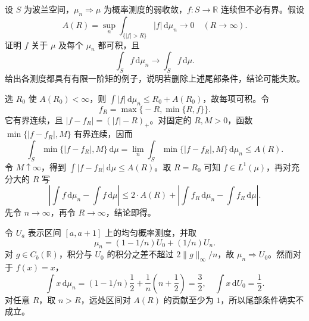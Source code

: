 \begin{exercise}\label{b1:ex:12-unbounded-tests}
设 \(S\) 为波兰空间，\(\mu_n\Rightarrow\mu\) 为概率测度的弱收敛，\(f:S\rightarrow\mathbb R\) 连续但不必有界。假设
\[
 A(R)=\sup_n\int_{\{|f|>R\}}|f|\,\mathrm d\mu_n
 \longrightarrow0\quad(R\longrightarrow\infty).
\]
证明 \(f\) 关于 \(\mu\) 及每个 \(\mu_n\) 都可积，且
\[
 \int_Sf\,\mathrm d\mu_n\longrightarrow\int_Sf\,\mathrm d\mu.
\]
给出各测度都具有有限一阶矩的例子，说明若删除上述尾部条件，结论可能失败。
\end{exercise}
\begin{solution}
选 \(R_0\) 使 \(A(R_0)<\infty\)，则
\(\int|f|\,\mathrm d\mu_n\le R_0+A(R_0)\)，故每项可积。令
\[
 f_R=\max\bigl\{-R,\min\{R,f\}\bigr\}.
\]
它有界连续，且 \(|f-f_R|=(|f|-R)_+\)。对固定的 \(R,M>0\)，函数 \(\min\{|f-f_R|,M\}\) 有界连续，因而
\[
 \int_S\min\{|f-f_R|,M\}\,\mathrm d\mu
 =\lim_n\int_S\min\{|f-f_R|,M\}\,\mathrm d\mu_n
 \le A(R).
\]
令 \(M\uparrow\infty\)，得到 \(\int|f-f_R|\,\mathrm d\mu\le A(R)\)。取 \(R=R_0\) 可知 \(f\in L^1(\mu)\)，再对充分大的 \(R\) 写
\[
 \left|\int f\,\mathrm d\mu_n-\int f\,\mathrm d\mu\right|
 \le2\cdot A(R)+\left|\int f_R\,\mathrm d\mu_n-\int f_R\,\mathrm d\mu\right|.
\]
先令 \(n\to\infty\)，再令 \(R\to\infty\)，结论即得。

令 \(U_a\) 表示区间 \([a,a+1]\) 上的均匀概率测度，并取
\[
 \mu_n=(1-1/n)U_0+(1/n)U_n.
\]
对 \(g\in C_b(\mathbb R)\)，积分与 \(U_0\) 的积分之差不超过 \(2\|g\|_\infty/n\)，故 \(\mu_n\Rightarrow U_0\)。然而对于 \(f(x)=x\)，
\[
 \int x\,\mathrm d\mu_n
 =(1-1/n)\frac12+\frac1n\left(n+\frac12\right)=\frac32,
 \quad\int x\,\mathrm dU_0=\frac12.
\]
对任意 \(R\)，取 \(n>R\)，远处区间对 \(A(R)\) 的贡献至少为 \(1\)，所以尾部条件确实不成立。
\end{solution}

